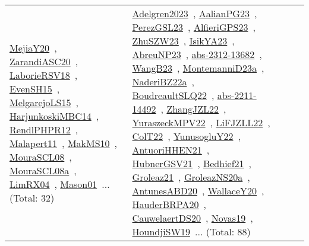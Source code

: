 {\begin{longtable}{lp{3cm}>{\raggedright\arraybackslash}p{6cm}>{\raggedright\arraybackslash}p{6cm}>{\raggedright\arraybackslash}p{8cm}}
\href{../works/MejiaY20.pdf}{MejiaY20}~\cite{MejiaY20}, \href{../works/ZarandiASC20.pdf}{ZarandiASC20}~\cite{ZarandiASC20}, \href{../works/LaborieRSV18.pdf}{LaborieRSV18}~\cite{LaborieRSV18}, \href{../works/EvenSH15.pdf}{EvenSH15}~\cite{EvenSH15}, \href{../works/MelgarejoLS15.pdf}{MelgarejoLS15}~\cite{MelgarejoLS15}, \href{../works/HarjunkoskiMBC14.pdf}{HarjunkoskiMBC14}~\cite{HarjunkoskiMBC14}, \href{../works/RendlPHPR12.pdf}{RendlPHPR12}~\cite{RendlPHPR12}, \href{../works/Malapert11.pdf}{Malapert11}~\cite{Malapert11}, \href{../works/MakMS10.pdf}{MakMS10}~\cite{MakMS10}, \href{../works/MouraSCL08.pdf}{MouraSCL08}~\cite{MouraSCL08}, \href{../works/MouraSCL08a.pdf}{MouraSCL08a}~\cite{MouraSCL08a}, \href{../works/LimRX04.pdf}{LimRX04}~\cite{LimRX04}, \href{../works/Mason01.pdf}{Mason01}~\cite{Mason01}... (Total: 32) & \href{../works/Adelgren2023.pdf}{Adelgren2023}~\cite{Adelgren2023}, \href{../works/AalianPG23.pdf}{AalianPG23}~\cite{AalianPG23}, \href{../works/PerezGSL23.pdf}{PerezGSL23}~\cite{PerezGSL23}, \href{../works/AlfieriGPS23.pdf}{AlfieriGPS23}~\cite{AlfieriGPS23}, \href{../works/ZhuSZW23.pdf}{ZhuSZW23}~\cite{ZhuSZW23}, \href{../works/IsikYA23.pdf}{IsikYA23}~\cite{IsikYA23}, \href{../works/AbreuNP23.pdf}{AbreuNP23}~\cite{AbreuNP23}, \href{../works/abs-2312-13682.pdf}{abs-2312-13682}~\cite{abs-2312-13682}, \href{../works/WangB23.pdf}{WangB23}~\cite{WangB23}, \href{../works/MontemanniD23a.pdf}{MontemanniD23a}~\cite{MontemanniD23a}, \href{../works/NaderiBZ22a.pdf}{NaderiBZ22a}~\cite{NaderiBZ22a}, \href{../works/BoudreaultSLQ22.pdf}{BoudreaultSLQ22}~\cite{BoudreaultSLQ22}, \href{../works/abs-2211-14492.pdf}{abs-2211-14492}~\cite{abs-2211-14492}, \href{../works/ZhangJZL22.pdf}{ZhangJZL22}~\cite{ZhangJZL22}, \href{../works/YuraszeckMPV22.pdf}{YuraszeckMPV22}~\cite{YuraszeckMPV22}, \href{../works/LiFJZLL22.pdf}{LiFJZLL22}~\cite{LiFJZLL22}, \href{../works/ColT22.pdf}{ColT22}~\cite{ColT22}, \href{../works/YunusogluY22.pdf}{YunusogluY22}~\cite{YunusogluY22}, \href{../works/AntuoriHHEN21.pdf}{AntuoriHHEN21}~\cite{AntuoriHHEN21}, \href{../works/HubnerGSV21.pdf}{HubnerGSV21}~\cite{HubnerGSV21}, \href{../works/Bedhief21.pdf}{Bedhief21}~\cite{Bedhief21}, \href{../works/Groleaz21.pdf}{Groleaz21}~\cite{Groleaz21}, \href{../works/GroleazNS20a.pdf}{GroleazNS20a}~\cite{GroleazNS20a}, \href{../works/AntunesABD20.pdf}{AntunesABD20}~\cite{AntunesABD20}, \href{../works/WallaceY20.pdf}{WallaceY20}~\cite{WallaceY20}, \href{../works/HauderBRPA20.pdf}{HauderBRPA20}~\cite{HauderBRPA20}, \href{../works/CauwelaertDS20.pdf}{CauwelaertDS20}~\cite{CauwelaertDS20}, \href{../works/Novas19.pdf}{Novas19}~\cite{Novas19}, \href{../works/HoundjiSW19.pdf}{HoundjiSW19}~\cite{HoundjiSW19}... (Total: 88)\\
\end{longtable}
}

